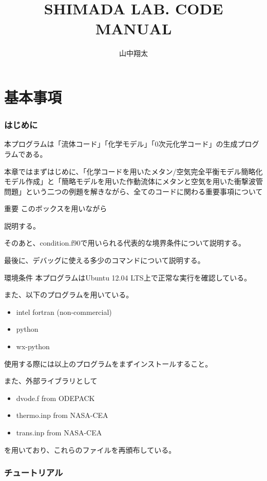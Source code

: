 \documentclass{jsarticle}
\begin{document}
\title{SHIMADA LAB. CODE\\MANUAL}
\author{山中翔太}%
\maketitle
\newpage
\tableofcontents
\newpage

\part{基本事項}
\newpage
\section{はじめに}%
本プログラムは「流体コード」「化学モデル」「0次元化学コード」の生成プログラムである。

本章ではまずはじめに、「化学コードを用いたメタン/空気完全平衡モデル簡略化モデル作成」と「簡略モデルを用いた作動流体にメタンと空気を用いた衝撃波管問題」という二つの例題を解きながら、全てのコードに関わる重要事項について
\begin{itembox}[l]{重要}
このボックスを用いながら
\end{itembox}
説明する。

そのあと、condition.f90で用いられる代表的な境界条件について説明する。

最後に、デバッグに使える多少のコマンドについて説明する。

\begin{itembox}[l]{環境条件}
本プログラムはUbuntu 12.04 LTS上で正常な実行を確認している。

また、以下のプログラムを用いている。
\begin{itemize}
\item intel fortran (non-commercial)
\item python
\item wx-python
\end{itemize}
使用する際には以上のプログラムをまずインストールすること。

また、外部ライブラリとして
\begin{itemize}
\item dvode.f from ODEPACK
\item thermo.inp from NASA-CEA
\item trans.inp from NASA-CEA
\end{itemize}
を用いており、これらのファイルを再頒布している。
\end{itembox}

\newpage
\section{チュートリアル}%
\end{document}
